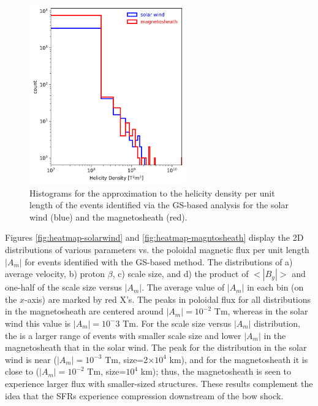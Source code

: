 \begin{figure}
    \centering
    \includegraphics[width=0.6\textwidth]{Figures/Histograms/histogram_helicitydensity.png}
    \caption[Histograms for the approximation to the helicity density per unit length]{Histograms for the approximation to the helicity density per unit length of the events identified via the GS-based analysis for the solar wind (blue) and the magnetosheath (red).}
    \label{fig:histogram-helicitydensity}
\end{figure}

Figures \ref{fig:heatmap-solarwind} and \ref{fig:heatmap-magntosheath} display the 2D distributions of various parameters vs. the poloidal magnetic flux per unit length $|A_m|$ for events identified with the GS-based method. The distributions of a) average velocity, b) proton $\beta$, c) scale size, and d) the product of $<|B_y|>$ and one-half of the scale size versus $|A_m|$. The average value of $|A_m|$ in each bin (on the $x$-axis) are marked by red X's. The peaks in poloidal flux for all distributions in the magnetosheath are centered around $|A_m|=10^{-2}$ Tm, whereas in the solar wind this value is $|A_m|=10^-{3}$ Tm. For the scale size versus $|A_m|$ distribution, the is a larger range of events with smaller scale size and lower $|A_m|$ in the magnetosheath that in the solar wind. The peak for the distribution in the solar wind is near ($|A_m|=10^{-3}$ Tm, size=2$\times 10^4$ km), and for the magnetosheath it is close to ($|A_m|=10^{-2}$ Tm, size=$10^4$ km); thus, the magnetosheath is seen to experience larger flux with smaller-sized structures. These results complement the idea that the SFRs experience compression downstream of the bow shock.

